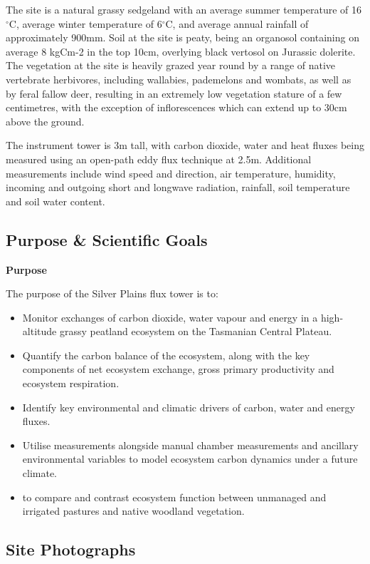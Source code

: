 \documentclass[11pt,a4paper]{article}
\begin{document}
The site is a natural grassy sedgeland with an average summer temperature of 16$^\circ$C, average winter temperature of 6$^\circ$C, and average annual rainfall of approximately 900mm. Soil at the site is peaty, being an organosol containing on average 8 kgCm-2 in the top 10cm, overlying black vertosol on Jurassic dolerite. The vegetation at the site is heavily grazed year round by a range of native vertebrate herbivores, including wallabies, pademelons and wombats, as well as by feral fallow deer, resulting in an extremely low vegetation stature of a few centimetres, with the exception of inflorescences which can extend up to 30cm above the ground.

The instrument tower is 3m tall, with carbon dioxide, water and heat fluxes being measured using an open-path eddy flux technique at 2.5m. Additional measurements include wind speed and direction, air temperature, humidity, incoming and outgoing short and longwave radiation, rainfall, soil temperature and soil water content.

\subsection*{Purpose \& Scientific Goals}

\textbf{Purpose}

The purpose of the Silver Plains flux tower is to:

\begin{itemize}
  \item Monitor exchanges of carbon dioxide, water vapour and energy in a high-altitude grassy peatland ecosystem on the Tasmanian Central Plateau.
  \item Quantify the carbon balance of the ecosystem, along with the key components of net ecosystem exchange, gross primary productivity and ecosystem respiration.
  \item Identify key environmental and climatic drivers of carbon, water and energy fluxes.
  \item Utilise measurements alongside manual chamber measurements and ancillary environmental variables to model ecosystem carbon dynamics under a future climate.
  \item to compare and contrast ecosystem function between unmanaged and irrigated pastures and native woodland vegetation.
\end{itemize}

\subsection*{Site Photographs}
\end{document}
